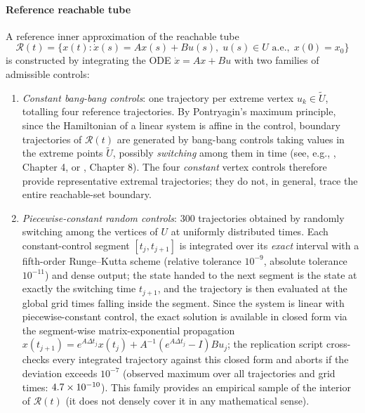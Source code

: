 \documentclass[11pt]{elsarticle}
\theoremstyle{definition}
\theoremstyle{remark}
\numberwithin{equation}{section}
\begin{document}
\paragraph{Reference reachable tube}
A reference inner approximation of the reachable tube
\begin{equation}
  \label{eq:reachable-tube}
  \mathcal{R}(t)
  =
  \bigl\{
    x(t)
    :
    \dot{x}(s) = Ax(s) + Bu(s),\;
    u(s) \in U \text{ a.e.},\;
    x(0) = x_0
  \bigr\}
\end{equation}
is constructed by integrating the ODE $\dot{x} = Ax + Bu$ with two families
of admissible controls:
\begin{enumerate}
	\item[(a)] \emph{Constant bang-bang controls}: one trajectory per extreme
	vertex $u_k \in \widetilde{U}$, totalling four reference trajectories.
	By Pontryagin's maximum principle, since the Hamiltonian of a linear
	system is affine in the control, boundary trajectories of
	$\mathcal{R}(t)$ are generated by bang-bang controls taking values in
	the extreme points $\widetilde{U}$, possibly \emph{switching} among
	them in time (see, e.g., \cite{LeeMarkus1967}, Chapter 4, or
	\cite{aubin_cellina_1984}, Chapter 8). The four \emph{constant} vertex
	controls therefore provide representative extremal trajectories; they do
	not, in general, trace the entire reachable-set boundary.
  \item[(b)] \emph{Piecewise-constant random controls}: 300 trajectories obtained
        by randomly switching among the vertices of $U$ at uniformly
        distributed times. Each constant-control segment
        $[t_j,t_{j+1}]$ is integrated over its \emph{exact} interval with a
        fifth-order Runge--Kutta scheme (relative tolerance $10^{-9}$,
        absolute tolerance $10^{-11}$) and dense output; the state handed to
        the next segment is the state at exactly the switching time
        $t_{j+1}$, and the trajectory is then evaluated at the global grid
        times falling inside the segment. Since the system is linear with
        piecewise-constant control, the exact solution is available in
        closed form via the segment-wise matrix-exponential propagation
        $x(t_{j+1}) = e^{A\Delta t_j}x(t_j) + A^{-1}(e^{A\Delta t_j}-I)Bu_j$;
        the replication script cross-checks every integrated trajectory
        against this closed form and aborts if the deviation exceeds
        $10^{-7}$ (observed maximum over all trajectories and grid times:
        $4.7\times 10^{-10}$).
        This family provides an empirical sample of the interior of
        $\mathcal{R}(t)$ (it does not densely cover it in any
        mathematical sense).
\end{enumerate}
\end{document}
